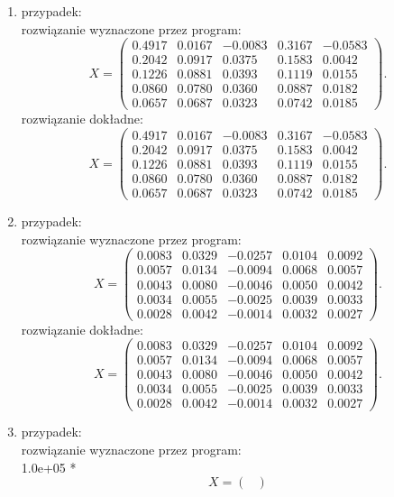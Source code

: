 \documentclass[12pt]{article}
\begin{document}
\begin{enumerate}
\item przypadek:
\\
rozwi\k{a}zanie wyznaczone przez program:
\[
X=\begin{pmatrix}
0.4917 & 0.0167 & -0.0083 & 0.3167 & -0.0583 \\
0.2042 & 0.0917 & 0.0375 & 0.1583 & 0.0042 \\
0.1226 & 0.0881 & 0.0393 & 0.1119 & 0.0155 \\
0.0860 & 0.0780 & 0.0360 & 0.0887 & 0.0182 \\
0.0657 & 0.0687 & 0.0323 & 0.0742 & 0.0185
\end{pmatrix}.
\]
rozwi\k{a}zanie dok\l{}adne:
\[
X=\begin{pmatrix}
0.4917 & 0.0167 & -0.0083 & 0.3167 & -0.0583 \\
0.2042 & 0.0917 & 0.0375 & 0.1583 & 0.0042 \\
0.1226 & 0.0881 & 0.0393 & 0.1119 & 0.0155 \\
0.0860 & 0.0780 & 0.0360 & 0.0887 & 0.0182 \\
0.0657 & 0.0687 & 0.0323 & 0.0742 & 0.0185
\end{pmatrix}.
\]
\item przypadek:
\\
rozwi\k{a}zanie wyznaczone przez program:
\[
X=\begin{pmatrix}
0.0083 & 0.0329 & -0.0257 & 0.0104 & 0.0092 \\
0.0057 & 0.0134 & -0.0094 & 0.0068 & 0.0057 \\
0.0043 & 0.0080 & -0.0046 & 0.0050 & 0.0042 \\
0.0034 & 0.0055 & -0.0025 & 0.0039 & 0.0033 \\
0.0028 & 0.0042 & -0.0014 & 0.0032 & 0.0027
\end{pmatrix}.
\]
rozwi\k{a}zanie dok\l{}adne:
\[
X=\begin{pmatrix}
0.0083 & 0.0329 & -0.0257 & 0.0104 & 0.0092 \\
0.0057 & 0.0134 & -0.0094 & 0.0068 & 0.0057 \\
0.0043 & 0.0080 & -0.0046 & 0.0050 & 0.0042 \\
0.0034 & 0.0055 & -0.0025 & 0.0039 & 0.0033 \\
0.0028 & 0.0042 & -0.0014 & 0.0032 & 0.0027
\end{pmatrix}.
\]
\item przypadek:
\\
rozwi\k{a}zanie wyznaczone przez program:
\\ 1.0e+05 *
\[ 
X=\begin{pmatrix}

\end{pmatrix}\]
\end{enumerate}
\end{document}
